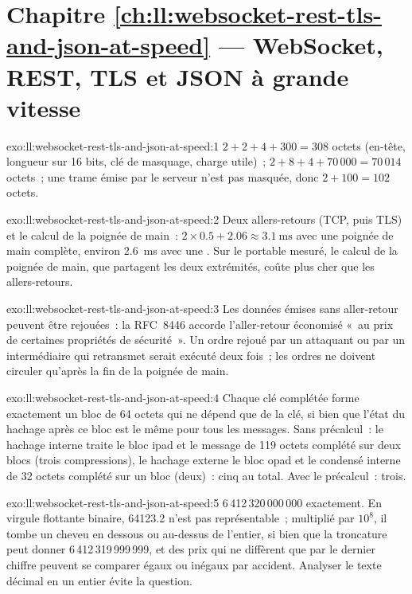 \section*{Chapitre \ref{ch:ll:websocket-rest-tls-and-json-at-speed} --- WebSocket, REST, TLS et JSON à grande vitesse}

\begin{solution}{exo:ll:websocket-rest-tls-and-json-at-speed:1}
$2 + 2 + 4 + 300 = 308$ octets (en-tête, longueur sur 16 bits, clé de masquage, charge utile)~; $2 + 8 + 4 + 70\,000 = 70\,014$ octets~; une
trame émise par le serveur n'est pas masquée, donc $2 + 100 = 102$ octets.
\end{solution}

\begin{solution}{exo:ll:websocket-rest-tls-and-json-at-speed:2}
Deux allers-retours (TCP, puis TLS) et le calcul de la poignée de main~: $2 \times 0.5 + 2.06 \approx \qty{3.1}{\milli\second}$ avec une
poignée de main complète, environ \qty{2.6}{\milli\second} avec une . Sur le portable mesuré, le calcul de la poignée de main, que
partagent les deux extrémités, coûte plus cher que les allers-retours.
\end{solution}

\begin{solution}{exo:ll:websocket-rest-tls-and-json-at-speed:3}
Les données émises sans aller-retour peuvent être rejouées~: la RFC~8446 accorde l'aller-retour économisé «~au prix de certaines propriétés de sécurité~». Un
ordre rejoué par un attaquant ou par un intermédiaire qui retransmet serait exécuté deux fois~; les ordres ne doivent circuler qu'après la
fin de la poignée de main.
\end{solution}

\begin{solution}{exo:ll:websocket-rest-tls-and-json-at-speed:4}
Chaque clé complétée forme exactement un bloc de 64 octets qui ne dépend que de la clé, si bien que l'état du hachage après ce bloc est le même pour
tous les messages. Sans précalcul~: le hachage interne traite le bloc ipad et le message de 119 octets complété sur deux blocs (trois
compressions), le hachage externe le bloc opad et le condensé interne de 32 octets complété sur un bloc (deux)~: cinq au total. Avec le précalcul~: trois.
\end{solution}

\begin{solution}{exo:ll:websocket-rest-tls-and-json-at-speed:5}
6\,412\,320\,000\,000 exactement. En virgule flottante binaire, 64123.2 n'est pas représentable~; multiplié par $10^8$, il tombe un cheveu
en dessous ou au-dessus de l'entier, si bien que la troncature peut donner 6\,412\,319\,999\,999, et des prix qui ne diffèrent que par le dernier chiffre peuvent
se comparer égaux ou inégaux par accident. Analyser le texte décimal en un entier évite la question.
\end{solution}

